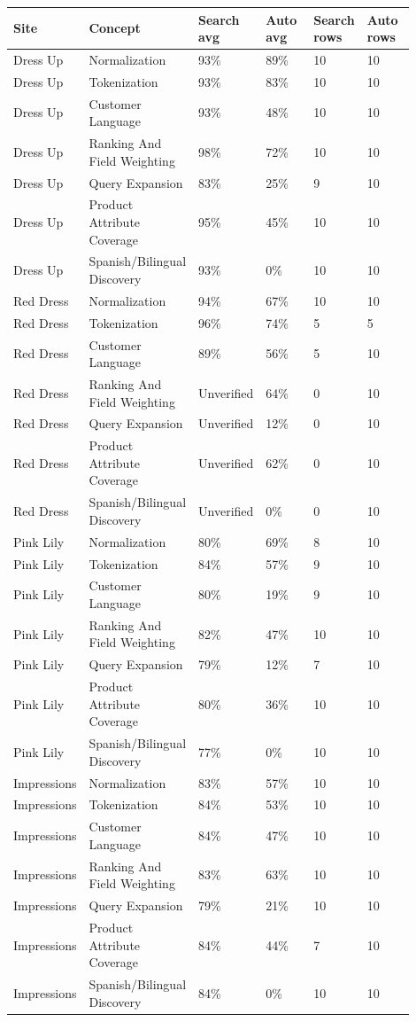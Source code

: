 \documentclass[10pt]{article}
\begin{document}
{\fontsize{7.35}{8.65}\selectfont
\setlength{\tabcolsep}{2.0pt}
\begin{longtable}{@{}L{0.18\linewidth}L{0.24\linewidth}R{0.12\linewidth}R{0.12\linewidth}R{0.12\linewidth}R{0.12\linewidth}@{}}
\toprule
\textbf{Site} & \textbf{Concept} & \textbf{Search avg} & \textbf{Auto avg} & \textbf{Search rows} & \textbf{Auto rows}\\
\midrule
\endhead
Dress Up & Normalization & 93\% & 89\% & 10 & 10\\
Dress Up & Tokenization & 93\% & 83\% & 10 & 10\\
Dress Up & Customer Language & 93\% & 48\% & 10 & 10\\
Dress Up & Ranking And Field Weighting & 98\% & 72\% & 10 & 10\\
Dress Up & Query Expansion & 83\% & 25\% & 9 & 10\\
Dress Up & Product Attribute Coverage & 95\% & 45\% & 10 & 10\\
Dress Up & Spanish/Bilingual Discovery & 93\% & 0\% & 10 & 10\\
Red Dress & Normalization & 94\% & 67\% & 10 & 10\\
Red Dress & Tokenization & 96\% & 74\% & 5 & 5\\
Red Dress & Customer Language & 89\% & 56\% & 5 & 10\\
Red Dress & Ranking And Field Weighting & Unverified & 64\% & 0 & 10\\
Red Dress & Query Expansion & Unverified & 12\% & 0 & 10\\
Red Dress & Product Attribute Coverage & Unverified & 62\% & 0 & 10\\
Red Dress & Spanish/Bilingual Discovery & Unverified & 0\% & 0 & 10\\
Pink Lily & Normalization & 80\% & 69\% & 8 & 10\\
Pink Lily & Tokenization & 84\% & 57\% & 9 & 10\\
Pink Lily & Customer Language & 80\% & 19\% & 9 & 10\\
Pink Lily & Ranking And Field Weighting & 82\% & 47\% & 10 & 10\\
Pink Lily & Query Expansion & 79\% & 12\% & 7 & 10\\
Pink Lily & Product Attribute Coverage & 80\% & 36\% & 10 & 10\\
Pink Lily & Spanish/Bilingual Discovery & 77\% & 0\% & 10 & 10\\
Impressions & Normalization & 83\% & 57\% & 10 & 10\\
Impressions & Tokenization & 84\% & 53\% & 10 & 10\\
Impressions & Customer Language & 84\% & 47\% & 10 & 10\\
Impressions & Ranking And Field Weighting & 83\% & 63\% & 10 & 10\\
Impressions & Query Expansion & 79\% & 21\% & 10 & 10\\
Impressions & Product Attribute Coverage & 84\% & 44\% & 7 & 10\\
Impressions & Spanish/Bilingual Discovery & 84\% & 0\% & 10 & 10\\
\bottomrule
\end{longtable}
}
\end{document}
